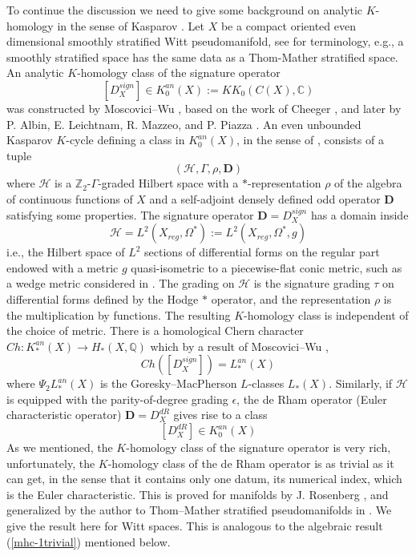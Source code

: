 \documentclass[11pt,leqno,twoside]{amsart}
\theoremstyle{plainsl}
\theoremstyle{definition}
\newcommand{\C}{\mathbb{C}}
\newcommand{\Q}{\mathbb{Q}}
\newcommand{\cH}{\mathcal{H}}
\newcommand{\bD}{\mathbf{D}}
\begin{document}
To continue the discussion we need to give some background on analytic $K$-homology in the sense of Kasparov \cite{K}.
Let $X$ be a compact oriented even dimensional smoothly stratified Witt pseudomanifold, see \cite{ALMP, ABP1} for terminology, e.g., a smoothly stratified space has the same data as a Thom-Mather stratified space. An analytic $K$-homology class of the signature operator $$\left[D_X^{sign}\right]\in K_{0}^{an}(X):=KK_0(C(X),\C)$$ was constructed by Moscovici--Wu \cite{MW}, based on the work of Cheeger \cite{Ch}, and later by P. Albin, E. Leichtnam, R. Mazzeo, and P. Piazza \cite{ALMP}. An even unbounded Kasparov $K$-cycle defining a class in $K_{0}^{an}(X)$, in the sense of \cite{BJ}, consists of a tuple $$(\mathcal H,\Gamma,\rho,\bD)$$ where  $\cH$ is  a $\mathbb{Z}_2$-$\Gamma$-graded Hilbert space with a \(*\)-representation $\rho$ of the algebra of continuous functions of $X$ and a self-adjoint densely defined odd operator $\bD$ satisfying some properties.   The signature operator $\bD=D_X^{sign}$  has a domain inside  $$\mathcal{H}=L^2(X_{reg},\Omega^*):=L^2(X_{reg},\Omega^*,g)$$ i.e., the Hilbert space of $L^2$ sections of differential forms on the regular part
 endowed with a metric $g$ quasi-isometric to a piecewise-flat conic metric, such as a wedge metric considered in \cite{ALMP}. The grading on $\cH$ is the signature grading $\tau$ on differential forms defined by the Hodge $\ast$ operator, and the representation $\rho$ is the multiplication by functions. The resulting $K$-homology class is independent of the choice of metric. There is a homological Chern character $Ch:K_*^{an}(X)\rightarrow H_*(X,\Q)$ which by a result of  Moscovici--Wu \cite{MW}, 
\begin{equation}\label{mw_lclass}
    Ch(\left[D_X^{sign}\right])=L^{an}_*(X)
\end{equation}
where $\Psi_2L^{an}_*(X)$ is  the Goresky--MacPherson $L$-classes $L_*(X)$. Similarly, if $\cH$ is equipped with  the  parity-of-degree  grading $\epsilon$, the de Rham operator (Euler characteristic operator) $\bD=D^{dR}_X$ gives rise to a class \cite{A2} $$\left[D_X^{dR}\right]\in K_0^{an}(X)$$
 As we mentioned, the $K$-homology class of the signature operator is very rich, unfortunately, the $K$-homology class of the de Rham operator is as trivial as it can get, in the sense that it contains only one datum, its numerical index, which is the Euler characteristic. This is proved for manifolds by J. Rosenberg \cite{R2}, and generalized by the author to Thom–Mather stratified pseudomanifolds in \cite{A2}. We give the result here for Witt spaces. This is analogous to the algebraic result (\ref{mhc-1trivial}) mentioned below.
\end{document}
